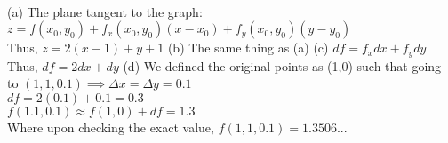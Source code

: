 \documentclass{article}
\begin{document}
\sol
\\ (a) The plane tangent to the graph: $z=f\left(x_0, y_0\right)+f_x\left(x_0, y_0\right)\left(x-x_0\right)+f_y\left(x_0, y_0\right)\left(y-y_0\right)$
\\Thus, $z = 2(x-1) + y + 1$
\double
(b) The same thing as (a)
\double
(c) $df = f_x dx + f_y dy$
\\ Thus, $df = 2 dx+ dy$
\double
(d) We defined the original points as (1,0) such that going to $(1,1, 0.1) \implies \Delta x = \Delta y = 0.1$
\\ $df = 2(0.1) + 0.1 = 0.3$
\\ $f(1.1,0.1) \approx f(1,0) + df = 1.3$
\\ Where upon checking the exact value, $f(1,1,0.1) = 1.3506...$
\end{document}
